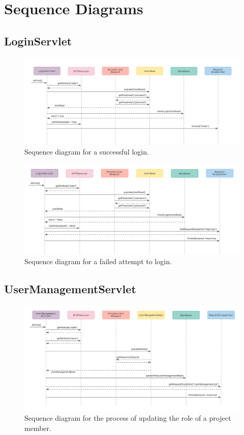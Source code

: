 \documentclass{article}
\begin{document}
\section{Sequence Diagrams}
\subsection{LoginServlet}

\begin{figure}[H]
    \centering
    \includegraphics[scale=0.6]{images/successfulLogin.png}
    \caption{Sequence diagram for a successful login.}
    \label{fig:successfulLogin}
\end{figure}

\begin{figure}[H]
    \centering
    \includegraphics[scale=0.6]{images/failedLogin.png}
    \caption{Sequence diagram for a failed attempt to login.}
    \label{fig:failedLoginAttempt}
\end{figure}

\pagebreak
\subsection{UserManagementServlet}

\begin{figure}[H]
    \centering
    \includegraphics[scale=0.6]{images/updateRole.png}
    \caption{Sequence diagram for the process of updating the role of a project member.}
    \label{fig:successfulLogin}
\end{figure}
\end{document}
